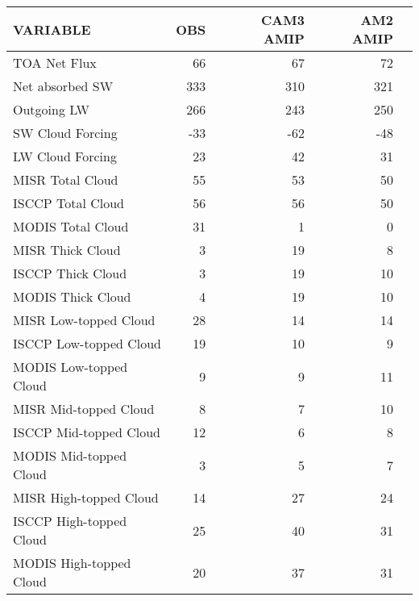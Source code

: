 \begin{tabular}{lrrrr}
\hline
                VARIABLE &                      OBS &                CAM3 AMIP &                 AM2 AMIP \\ \hline
            TOA Net Flux &                       66 &                       67 &                       72 \\
         Net absorbed SW &                      333 &                      310 &                      321 \\
             Outgoing LW &                      266 &                      243 &                      250 \\
        SW Cloud Forcing &                      -33 &                      -62 &                      -48 \\
        LW Cloud Forcing &                       23 &                       42 &                       31 \\
        MISR Total Cloud &                       55 &                       53 &                       50 \\
       ISCCP Total Cloud &                       56 &                       56 &                       50 \\
       MODIS Total Cloud &                       31 &                        1 &                        0 \\
        MISR Thick Cloud &                        3 &                       19 &                        8 \\
       ISCCP Thick Cloud &                        3 &                       19 &                       10 \\
       MODIS Thick Cloud &                        4 &                       19 &                       10 \\
   MISR Low-topped Cloud &                       28 &                       14 &                       14 \\
  ISCCP Low-topped Cloud &                       19 &                       10 &                        9 \\
  MODIS Low-topped Cloud &                        9 &                        9 &                       11 \\
   MISR Mid-topped Cloud &                        8 &                        7 &                       10 \\
  ISCCP Mid-topped Cloud &                       12 &                        6 &                        8 \\
  MODIS Mid-topped Cloud &                        3 &                        5 &                        7 \\
  MISR High-topped Cloud &                       14 &                       27 &                       24 \\
 ISCCP High-topped Cloud &                       25 &                       40 &                       31 \\
 MODIS High-topped Cloud &                       20 &                       37 &                       31 \\ \hline
\end{tabular}
